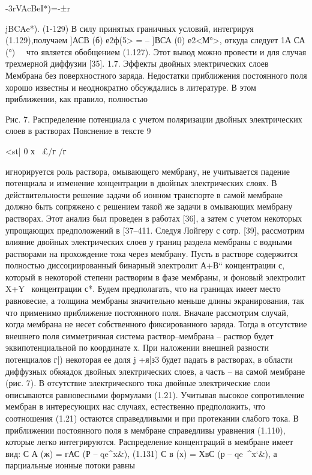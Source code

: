 -3rVAcBeI*)=-±r{jBCAe*). (1-129)
В силу принятых граничных условий, интегрируя (1.129),получаем
]АСВ (б) е2ф(5> = -- ]ВСА (0) е2<М°>,
откуда следует 1А СА (°) 
что является обобщением (1.127). Этот вывод можно провести и для случая трехмерной диффузии [35].
1.7. Эффекты двойных электрических слоев
Мембрана без поверхностного заряда. Недостатки приближения постоянного поля хорошо известны и неоднократно обсуждались в литературе. В этом приближении, как правило, полностью


Рис. 7. Распределение потенциала с учетом поляризации двойных электрических слоев в растворах Пояснение в тексте
 9

 <st| 0  х
~£/г   \8/г




игнорируется роль раствора, омывающего мембрану, не учитывается падение потенциала и изменение концентрации в двойных электрических слоях. В действительности решение задачи об ионном транспорте в самой мембране должно быть сопряжено с решением такой же задачи в омывающих мембрану растворах. Этот анализ был проведен в работах [36], а затем с учетом некоторых упрощающих предположений в [37--411.
Следуя Лойгеру с сотр. [39], рассмотрим влияние двойных электрических слоев у границ раздела мембраны с водными растворами на прохождение тока через мембрану. Пусть в растворе содержится полностью диссоциированный бинарный электролит А+В“ концентрации с, который в некоторой степени растворим в фазе мембраны, и фоновый электролит X+Y~ концентрации с*. Будем предполагать, что на границах имеет место равновесие, а толщина мембраны значительно меньше длины экранирования, так что применимо приближение постоянного поля. Вначале рассмотрим случай, когда мембрана не несет собственного фиксированного заряда. Тогда в отсутствие внешнего поля симметричная система раствор--мембрана -- раствор будет эквипотенциальной по координате х. При наложении внешней разности потенциалов г|) некоторая ее доля j +я|з3 будет падать в растворах, в области диффузных обкяадок двойных электрических слоев, а часть -- на самой мембране (рис. 7). В отсутствие электрического тока двойные электрические слои описываются равновесными формулами (1.21). Учитывая высокое сопротивление мембран в интересующих нас случаях, естественно предположить, что соотношения (1.21) остаются справедливыми и при протекании слабого тока. В приближении постоянного поля в мембране справедливы уравнения (1.110), которые легко интегрируются. Распределение
концентраций в мембране имеет вид:
С А (ж) = гАС (Р -- qe^x&),
(1.131)
С в (х) = ХвС (р -- qe~^x‘&), а парциальные ионные потоки равны
}
